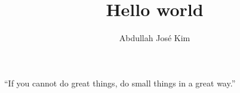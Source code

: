 \documentclass{bonaparticle}
\title {Hello world}
\author{Abdullah José Kim}
\begin{document}
    \maketitle


    \begin{multicols}{3}
        \begin{lead}
            \lipsum[1]
        \end{lead}

        \lipsum[2-3]
        
        \begin{pullquote}
            ``If you cannot do great things, do small things in a great way.''
        \end{pullquote}
        
        \lipsum[4]
        
    \end{multicols}
\end{document}
